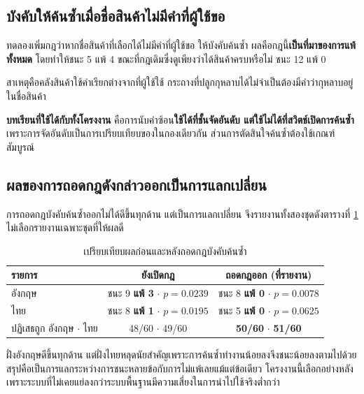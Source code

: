 \subsection{บังคับให้ค้นซ้ำเมื่อชื่อสินค้าไม่มีคำที่ผู้ใช้ขอ}

ทดลองเพิ่มกฎว่าหากชื่อสินค้าที่เลือกได้ไม่มีคำที่ผู้ใช้ขอ ให้บังคับค้นซ้ำ ผลคือกฎนี้\textbf{เป็นที่มาของการแพ้ทั้งหมด} โดยทำให้ชนะ 5 แพ้ 4 ขณะที่กฎเดิมซึ่งดูเพียงว่าได้สินค้าครบหรือไม่ ชนะ 12 แพ้ 0

สาเหตุคือคลังสินค้าใช้คำเรียกต่างจากที่ผู้ใช้ใช้ กระถางที่ปลูกกุหลาบได้ไม่จำเป็นต้องมีคำว่ากุหลาบอยู่ในชื่อสินค้า

\textbf{บทเรียนที่ใช้ได้กับทั้งโครงงาน} คือการนับคำซ้อน\textbf{ใช้ได้ที่ชั้นจัดอันดับ แต่ใช้ไม่ได้ที่สวิตช์เปิดการค้นซ้ำ} เพราะการจัดอันดับเป็นการเปรียบเทียบของในกองเดียวกัน ส่วนการตัดสินใจค้นซ้ำต้องใช้เกณฑ์สัมบูรณ์

\subsection{ผลของการถอดกฎดังกล่าวออกเป็นการแลกเปลี่ยน}

การถอดกฎบังคับค้นซ้ำออกไม่ได้ดีขึ้นทุกด้าน แต่เป็นการแลกเปลี่ยน จึงรายงานทั้งสองชุดดังตารางที่ \ref{tab:tradeoff} ไม่เลือกรายงานเฉพาะชุดที่ให้ผลดี

\begin{table}[H]
\centering
\caption{เปรียบเทียบผลก่อนและหลังถอดกฎบังคับค้นซ้ำ}
\label{tab:tradeoff}
\begin{tabular}{|l|c|c|}
\hline
\textbf{รายการ} & \textbf{ยังเปิดกฎ} & \textbf{ถอดกฎออก (ที่รายงาน)} \\
\hline
อังกฤษ & ชนะ 9 \textbf{แพ้ 3} $\cdot$ $p = 0.0239$ & ชนะ 8 \textbf{แพ้ 0} $\cdot$ $p = 0.0078$ \\ \hline
ไทย & ชนะ 8 \textbf{แพ้ 1} $\cdot$ $p = 0.0195$ & ชนะ 5 \textbf{แพ้ 0} $\cdot$ $p = 0.0625$ \\ \hline
ปฏิเสธถูก อังกฤษ $\cdot$ ไทย & 48/60 $\cdot$ 49/60 & \textbf{50/60} $\cdot$ \textbf{51/60} \\
\hline
\end{tabular}
\end{table}

ฝั่งอังกฤษดีขึ้นทุกด้าน แต่ฝั่งไทยหลุดนัยสำคัญเพราะการค้นซ้ำทำงานน้อยลงจึงชนะน้อยลงตามไปด้วย สรุปคือเป็นการแลกระหว่างการชนะหลายข้อกับการไม่แพ้เลยแม้แต่ข้อเดียว โครงงานนี้เลือกอย่างหลังเพราะระบบที่ไม่เคยแย่ลงกว่าระบบพื้นฐานมีความเสี่ยงในการนำไปใช้จริงต่ำกว่า

